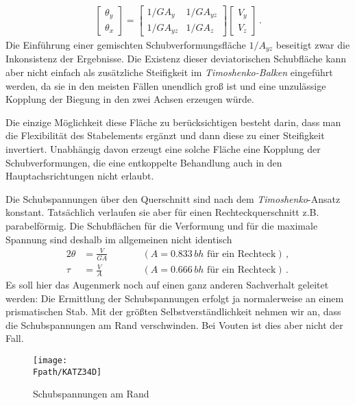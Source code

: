 \begin{align}
\left[\begin{array}{c}   \theta_y \\   \theta_x \end{array}\right] =\left[
\begin{array}{cc}
  1/GA_y & 1/GA_{yz} \\
  1/GA_{yz} & 1/GA_z
\end{array}\right] \left[ \begin{array}{c}   V_y \\   V_z \end{array} \right]\,.
\end{align}
Die Einf\"{u}hrung einer gemischten Schubverformungsfl\"{a}che $1/A_{yz}$ beseitigt zwar die Inkonsistenz der Ergebnisse. Die Existenz dieser deviatorischen Schubfl\"{a}che kann aber nicht einfach als zus\"{a}tzliche Steifigkeit im {\em Timoshenko-Balken\/} eingef\"{u}hrt werden, da sie in den meisten F\"{a}llen unendlich gro{\ss} ist und eine unzul\"{a}ssige Kopplung der Biegung in den zwei Achsen erzeugen w\"{u}rde.

Die einzige M\"{o}glichkeit diese Fl\"{a}che zu ber\"{u}cksichtigen besteht darin, dass man die Flexibilit\"{a}t des Stabelements erg\"{a}nzt und dann diese zu einer Steifigkeit invertiert. Unabh\"{a}ngig davon erzeugt eine solche Fl\"{a}che eine Kopplung der Schubverformungen, die eine entkoppelte Behandlung auch in den Hauptachsrichtungen nicht erlaubt.

Die Schubspannungen \"{u}ber den Querschnitt sind nach dem {\em Timoshenko\/}-Ansatz konstant. Tats\"{a}chlich verlaufen sie aber f\"{u}r einen Rechteckquerschnitt z.B. parabelf\"{o}rmig. Die Schubfl\"{a}chen f\"{u}r die Verformung und f\"{u}r die maximale Spannung sind deshalb im allgemeinen nicht identisch
\begin{alignat}{2}
\theta &= \frac{V}{GA} \qquad &&(A = 0.833\,bh\,\,\mbox{f\"{u}r ein Rechteck})\,, \\
\tau &= \frac{V}{A} \qquad &&(A = 0.666\,bh\,\,\mbox{f\"{u}r ein Rechteck}) \,.
\end{alignat}
Es soll hier das Augenmerk noch auf einen ganz anderen Sachverhalt geleitet werden: Die Ermittlung der Schubspannungen erfolgt ja normalerweise an einem prismatischen Stab. Mit der gr\"{o}{\ss}ten Selbstverst\"{a}ndlichkeit nehmen wir an, dass die Schubspannungen am Rand verschwinden. Bei Vouten ist dies aber nicht der Fall.
\begin{figure}[tbp] \centering
\if {} \sidecaption \fi
\texttt{[image: \\Fpath/KATZ34D]}
\caption{Schubspannungen am Rand}
\label{Katz34}%
\end{figure}%

